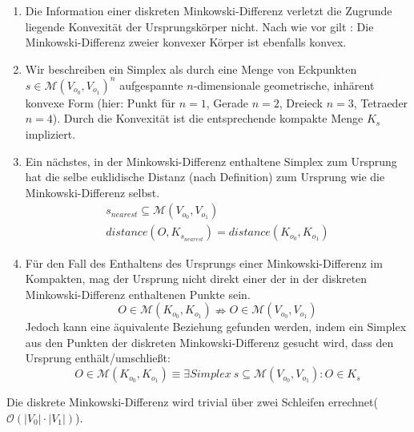 \begin{enumerate}
		\item Die Information einer diskreten Minkowski-Differenz verletzt die Zugrunde liegende Konvexität der Ursprungskörper nicht. Nach wie vor gilt : Die Minkowski-Differenz zweier konvexer Körper ist ebenfalls konvex.
		\item Wir beschreiben ein Simplex als durch eine Menge von Eckpunkten $s\in\mathcal{M}(V_{o_0}, V_{o_1})^n$ aufgespannte $n$-dimensionale geometrische, inhärent konvexe Form (hier: Punkt für $n=1$, Gerade $n=2$, Dreieck $n=3$, Tetraeder $n=4$). Durch die Konvexität ist die entsprechende kompakte Menge $K_s$ impliziert.
		\item Ein nächstes, in der Minkowski-Differenz enthaltene Simplex zum Ursprung hat die selbe euklidische Distanz (nach Definition) zum Ursprung wie die Minkowski-Differenz selbst.
\begin{align*}		
		s_{nearest} \subseteq \mathcal{M}(V_{o_0}, V_{o_1}) \\
		distance(O, K_{s_{nearest}}) = distance(K_{o_0}, K_{o_1})
		\end{align*}	 \cite[p. 195]{gjk}	
		\item Für den Fall des Enthaltens des Ursprungs einer Minkowski-Differenz im Kompakten, mag der Ursprung nicht direkt einer der in der diskreten Minkowski-Differenz enthaltenen Punkte sein.
		$$O \in \mathcal{M}(K_{o_0}, K_{o_1}) \nRightarrow O \in \mathcal{M}(V_{o_0}, V_{o_1})$$
		 Jedoch kann eine äquivalente Beziehung gefunden werden, indem ein Simplex aus den Punkten der diskreten Minkowski-Differenz gesucht wird, dass den Ursprung enthält/umschließt: 
		 $$O \in \mathcal{M}(K_{o_0}, K_{o_1}) \equiv \exists Simplex~s \subseteq \mathcal{M}(V_{o_0}, V_{o_1}) : O \in K_s$$

\end{enumerate}
Die diskrete Minkowski-Differenz wird trivial über zwei Schleifen errechnet($\mathcal{O}(|V_0| \cdot |V_1|)$).


